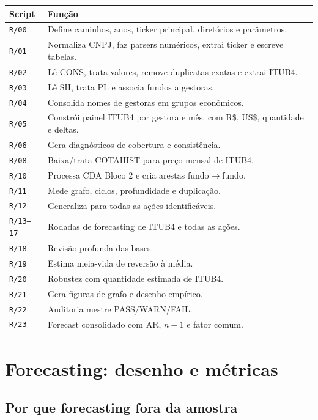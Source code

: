 \documentclass[11pt,a4paper]{article}
\begin{document}
\begin{longtable}{p{}p{}}
\toprule
Script & Função \\
\midrule
\endhead
\texttt{R/00} & Define caminhos, anos, ticker principal, diretórios e parâmetros. \\
\texttt{R/01} & Normaliza CNPJ, faz parsers numéricos, extrai ticker e escreve tabelas. \\
\texttt{R/02} & Lê CONS, trata valores, remove duplicatas exatas e extrai ITUB4. \\
\texttt{R/03} & Lê SH, trata PL e associa fundos a gestoras. \\
\texttt{R/04} & Consolida nomes de gestoras em grupos econômicos. \\
\texttt{R/05} & Constrói painel ITUB4 por gestora e mês, com R\$, US\$, quantidade e deltas. \\
\texttt{R/06} & Gera diagnósticos de cobertura e consistência. \\
\texttt{R/08} & Baixa/trata COTAHIST para preço mensal de ITUB4. \\
\texttt{R/10} & Processa CDA Bloco 2 e cria arestas fundo$\to$fundo. \\
\texttt{R/11} & Mede grafo, ciclos, profundidade e duplicação. \\
\texttt{R/12} & Generaliza para todas as ações identificáveis. \\
\texttt{R/13--17} & Rodadas de forecasting de ITUB4 e todas as ações. \\
\texttt{R/18} & Revisão profunda das bases. \\
\texttt{R/19} & Estima meia-vida de reversão à média. \\
\texttt{R/20} & Robustez com quantidade estimada de ITUB4. \\
\texttt{R/21} & Gera figuras de grafo e desenho empírico. \\
\texttt{R/22} & Auditoria mestre PASS/WARN/FAIL. \\
\texttt{R/23} & Forecast consolidado com AR, $n-1$ e fator comum. \\
\bottomrule
\end{longtable}

\section{Forecasting: desenho e métricas}

\subsection{Por que forecasting fora da amostra}
\end{document}
